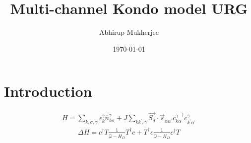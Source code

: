 \documentclass[12pt]{article}
\begin{document}
\title{Multi-channel Kondo model URG}
\author{Abhirup Mukherjee}
\date{\today}
\maketitle
\section{Introduction}

\begin{equation}\begin{aligned}
	H = \sum_{k,\sigma,\gamma}\epsilon_{k}^\gamma \hat n^\gamma_{k\sigma} + J\sum_{kk^\prime,\gamma} \vec{S_d}\cdot\vec{s}_{\alpha\alpha^\prime}{c^\gamma_{k\alpha}}^\dagger c^\gamma_{k^\prime\alpha^\prime}
\end{aligned}\end{equation}
\begin{equation}\begin{aligned}
	\Delta H = c^\dagger T \frac{1}{\hat \omega - H_D}T^\dagger c + T^\dagger c \frac{1}{\hat \omega - H_D}c^\dagger T
\end{aligned}\end{equation}
\end{document}
